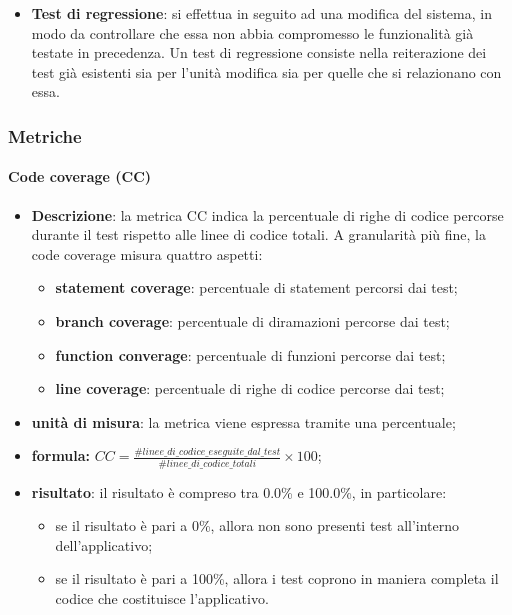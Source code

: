 \begin{itemize}
          \item \textbf{Test di regressione}: si effettua in seguito ad una modifica del sistema, in modo da controllare che essa non abbia compromesso le funzionalità già testate in precedenza. Un test di regressione consiste nella reiterazione dei test già esistenti sia per l'unità modifica sia per quelle che si relazionano con essa.
        \end{itemize}

	\subsubsection{Metriche}
			\paragraph{Code coverage (CC)}
				\begin{itemize}
					\item{\textbf{Descrizione}}: la metrica CC indica la percentuale di righe di codice percorse durante il test rispetto alle linee di codice totali. A granularità più fine, la code coverage misura quattro aspetti: 
						\begin{itemize}
							\item{\textbf{statement coverage}}: percentuale di statement percorsi dai test; 
							\item{\textbf{branch coverage}}: percentuale di diramazioni percorse dai test; 
							\item{\textbf{function converage}}: percentuale di funzioni percorse dai test; 
							\item{\textbf{line coverage}}: percentuale di righe di codice percorse dai test; 
						\end{itemize} 
					\item{\textbf{unità di misura}}: la metrica viene espressa tramite una percentuale;
					\item{\textbf{formula: }} $ CC = \displaystyle\frac{\#linee\_di\_codice\_eseguite\_dal\_test}{\#linee\_di\_codice\_totali}\times100$;
					\item{\textbf{risultato}}: il risultato è compreso tra 0.0\% e 100.0\%, in particolare: 
						\begin{itemize}
							\item se il risultato è pari a 0\%, allora non sono presenti test all'interno dell'applicativo; 
							\item se il risultato è pari a 100\%, allora i test coprono in maniera completa il codice che costituisce l'applicativo. 
						\end{itemize} 
				\end{itemize}

